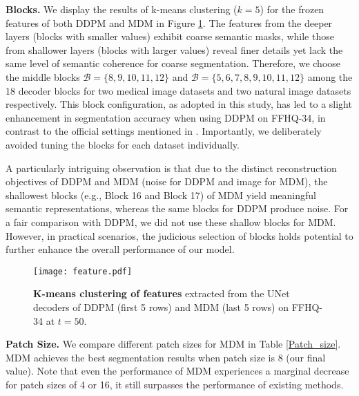 \documentclass{article} \usepackage{iclr2024_conference,times}
\begin{document}
\textbf{Blocks.} We display the results of k-means clustering ($k=5$) for the frozen features of both DDPM and MDM in Figure \ref{feature}.  
The features from the deeper layers (blocks with smaller values) exhibit coarse semantic masks, while those from shallower layers (blocks with larger values) reveal finer details yet lack the same level of semantic coherence for coarse segmentation. Therefore, we choose the middle blocks $\mathcal{B}=\{8, 9, 10, 11, 12\}$ and $\mathcal{B}=\{5, 6, 7, 8, 9, 10, 11, 12\}$ among the 18 decoder blocks for two medical image datasets and two natural image datasets respectively. This block configuration, as adopted in this study, has led to a slight enhancement in segmentation accuracy when using DDPM on FFHQ-34, in contrast to the official settings mentioned in \citet{DBLP:conf/iclr/BaranchukVRKB22}. Importantly, we deliberately avoided tuning the blocks for each dataset individually. 

A particularly intriguing observation is that due to the distinct reconstruction objectives of DDPM and MDM (noise for DDPM and image for MDM), the shallowest blocks (e.g., Block 16 and Block 17) of MDM yield meaningful semantic representations, whereas the same blocks for DDPM produce noise. For a fair comparison with DDPM, we did not use these shallow blocks for MDM. However, in practical scenarios, the judicious selection of blocks holds potential to further enhance the overall performance of our model.


\begin{figure}[htp]
\centering
\texttt{[image: feature.pdf]} \caption{\textbf{K-means clustering of features} extracted from the UNet decoders of DDPM (first 5 rows) and MDM (last 5 rows) on FFHQ-34 at $t=50$. }
\label{feature}
\end{figure}




\textbf{Patch Size.} We compare different patch sizes for MDM in Table \ref{Patch_size}. MDM achieves the best segmentation results when patch size is 8 (our final value). Note that even the performance of MDM experiences a marginal decrease for patch sizes of 4 or 16, it still surpasses the performance of existing methods.
\end{document}
